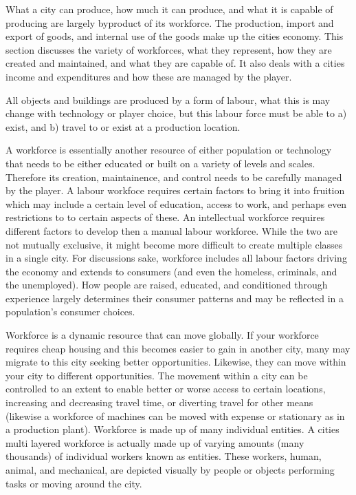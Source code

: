 
What a city can produce, how much it can produce, and what it is capable of producing are largely byproduct of its workforce. The production, import and export of goods, and internal use of the goods make up the cities economy. This section discusses the variety of workforces, what they represent, how they are created and maintained, and what they are capable of. It also deals with a cities income and expenditures and how these are managed by the player.  

All objects and buildings are produced by a form of labour, what this is may change with technology or player choice, but this labour force must be able to a) exist, and b) travel to or exist at a production location.

A workforce is essentially another resource of either population or technology that needs to be either educated or built on a variety of levels and scales. Therefore its creation, maintainence, and control needs to be carefully managed by the player. A labour workfoce requires certain factors to bring it into fruition which may include a certain level of education, access to work, and perhaps even restrictions to to certain aspects of these. An intellectual workforce requires different factors to develop then a manual labour workforce. While the two are not mutually exclusive, it might become more difficult to create multiple classes in a single city. For discussions sake, workforce includes all labour factors driving the economy and extends to consumers (and even the homeless, criminals, and the unemployed). How people are raised, educated, and conditioned through experience largely determines their consumer patterns and may be reflected in a population's consumer choices.

Workforce is a dynamic resource that can move globally. If your workforce requires cheap housing and this becomes easier to gain in another city, many may migrate to this city seeking better opportunities. Likewise, they can move within your city to different opportunities. The movement within a city can be controlled to an extent to enable better or worse access to certain locations, increasing and decreasing travel time, or diverting travel for other means (likewise a workforce of machines can be moved with expense or stationary as in a production plant). Workforce is made up of many individual entities. A cities multi layered workforce is actually made up of varying amounts (many thousands) of individual workers known as entities. These workers, human, animal, and mechanical, are depicted visually by people or objects performing tasks or moving around the city.

